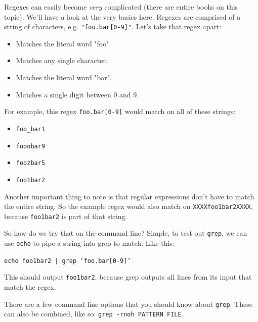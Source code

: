 \documentclass{TheAlternativeCourse}
\begin{document}
Regexes can easily become \emph{very} complicated (there are entire books on
this topic).  We'll have a look at the very basics here. Regexes are comprised
of a string of characters, e.g. \texttt{"foo.bar[0-9]"}. Let's take that regex
apart:

\begin{itemize}
    \setlength\itemsep{-9pt}
    \item{ Matches the literal word "foo".}
    \item{ Matches any single character.}
    \item{ Matches the literal word "bar".}
    \item{\makebox[1.5cm]{\: \texttt{[0-9]\hfill}} Matches a single digit between 0 and 9.}
\end{itemize}

For example, this regex \texttt{foo.bar[0-9]} would match on all of these
strings:

\begin{itemize}
    \setlength\itemsep{-9pt}
    \item \texttt{foo\_bar1}
    \item \texttt{fooobar9}
    \item \texttt{foozbar5}
    \item \texttt{foo1bar2}
\end{itemize}

Another important thing to note is that regular expressions don't have to match
the entire string. So the example regex would also match on
\texttt{XXXXfoo1bar2XXXX}, because \texttt{foo1bar2} is part of that string.

So how do we try that on the command line? Simple, to test out \texttt{grep},
we can use \texttt{echo} to pipe a string into grep to match. Like this:

\begin{cmdbox}
    \texttt{echo foo1bar2 | grep 'foo.bar[0-9]'}
\end{cmdbox}

This should output \texttt{foo1bar2}, because grep outputs all lines from its
input that match the regex.

There are a few command line options that you should know about \texttt{grep}.
These can also be combined, like so: \texttt{grep -rnoh PATTERN FILE}.
\end{document}

